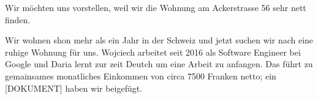 \documentclass[11pt, a4paper]{awesome-cv} %
\begin{document}
\makecvheader %

\makelettertitle %


\begin{cvletter}


Wir möchten uns vorstellen, weil wir die Wohnung am Ackerstrasse 56 sehr nett finden.

Wir wohnen shon mehr als ein Jahr in der Schweiz und jetzt suchen wir nach eine ruhige Wohnung für uns.
Wojciech arbeitet seit 2016 als Software Engineer bei Google und Daria lernt zur zeit Deutch um eine Arbeit zu anfangen.
Das führt zu gemainsames monatliches Einkommen von circa 7500 Franken netto; ein [DOKUMENT] haben wir beigefügt.









\end{cvletter}


\makeletterclosing %
\end{document}
